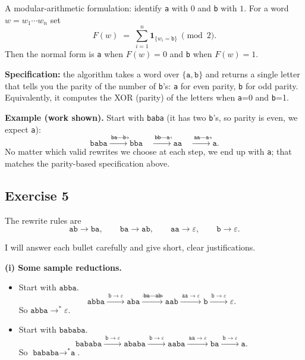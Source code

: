 \documentclass[12pt]{article}
\begin{document}
\begin{enumerate}[label=(\alph*)]
  A modular-arithmetic formulation: identify \texttt{a} with $0$ and \texttt{b} with $1$. For a word $w=w_1\cdots w_n$ set
  \[
    F(w)\;=\;\sum_{i=1}^n \mathbf{1}_{\{w_i=\texttt{b}\}}\ \pmod{2}.
  \]
  Then the normal form is \texttt{a} when $F(w)=0$ and \texttt{b} when $F(w)=1$.
  
  \textbf{Specification:} the algorithm takes a word over $\{\texttt{a},\texttt{b}\}$ and returns a single letter that tells you the parity of the number of \texttt{b}'s: \texttt{a} for even parity, \texttt{b} for odd parity. Equivalently, it computes the XOR (parity) of the letters when \texttt{a}=0 and \texttt{b}=1.
\end{enumerate}

\bigskip

\textbf{Example (work shown).} Start with \texttt{baba} (it has two \texttt{b}'s, so parity is even, we expect \texttt{a}):
\[
\texttt{baba} \xrightarrow{\ \texttt{ba}\to\texttt{b}\ } \texttt{bba}
\quad\xrightarrow{\ \texttt{bb}\to\texttt{a}\ } \texttt{aa}
\quad\xrightarrow{\ \texttt{aa}\to\texttt{a}\ } \texttt{a}.
\]
No matter which valid rewrites we choose at each step, we end up with \texttt{a}; that matches the parity-based specification above.


\subsection*{Exercise 5}

The rewrite rules are
\[
\texttt{ab}\longrightarrow\texttt{ba},\qquad
\texttt{ba}\longrightarrow\texttt{ab},\qquad
\texttt{aa}\longrightarrow\varepsilon,\qquad
\texttt{b}\longrightarrow\varepsilon.
\]

I will answer each bullet carefully and give short, clear justifications.

\medskip

\textbf{(i) Some sample reductions.}

\begin{itemize}
  \item Start with \(\texttt{abba}\).
  \[
    \texttt{abba}\xrightarrow{\ \texttt{b}\to\varepsilon\ } \texttt{aba}
    \xrightarrow{\ \texttt{ba}\to\texttt{ab}\ } \texttt{aab}
    \xrightarrow{\ \texttt{aa}\to\varepsilon\ } \texttt{b}
    \xrightarrow{\ \texttt{b}\to\varepsilon\ }\varepsilon.
  \]
  So \(\texttt{abba}\to^{*}\varepsilon\).
  \item Start with \(\texttt{bababa}\).
  \[
    \texttt{bababa}\xrightarrow{\ \texttt{b}\to\varepsilon\ } \texttt{ababa}
    \xrightarrow{\ \texttt{b}\to\varepsilon\ } \texttt{aaba}
    \xrightarrow{\ \texttt{aa}\to\varepsilon\ } \texttt{ba}
    \xrightarrow{\ \texttt{b}\to\varepsilon\ } \texttt{a}.
  \]
  So \(\texttt{bababa}\to^{*}\texttt{a}\).
\end{itemize}
\end{document}
